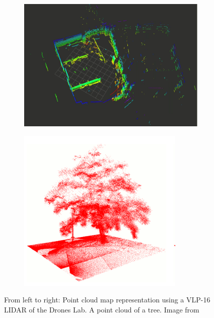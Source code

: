 \begin{figure}
    \begin{subfigure}[b]{0.498\textwidth}
		\centering
		\includegraphics[width=\textwidth]{images/Symmetry_ppt.png}
		\label{subfig:a}
		\caption{}
		\vspace{2em}
	\end{subfigure}
	\begin{subfigure}[b]{0.498\textwidth}
	    \centering
		\includegraphics[width=\textwidth]{images/occupancytree.png}
		\label{subfig:b}
		\caption{}
	\end{subfigure}
    \caption{From left to right: Point cloud map representation using a VLP-16 LIDAR of the Drones Lab. A point cloud of a tree. Image from \cite{21}}
\end{figure}

